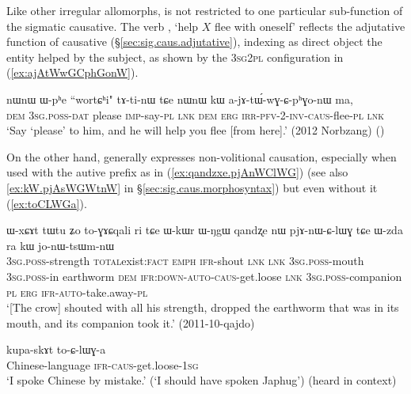 Like other irregular allomorphs,  is not restricted to one particular sub-func\-tion of the sigmatic causative. The verb , `help $X$ flee with oneself' reflects the adjutative function of causative (§\ref{sec:sig.caus.adjutative}), indexing as direct object the entity helped by the subject, as shown by the \textsc{3sg}\fl{}\textsc{2pl} configuration in (\ref{ex:ajAtWwGCphGonW}).

\begin{exe}
\ex \label{ex:ajAtWwGCphGonW}
\gll nɯnɯ ɯ-pʰe ``wortɕʰi" tɤ-ti-nɯ tɕe nɯnɯ kɯ a-jɤ-tɯ́-wɣ-ɕ-pʰɣo-nɯ ma, \\
\textsc{dem} \textsc{3sg}.\textsc{poss}-\textsc{dat} please \textsc{imp}-say-\textsc{pl} \textsc{lnk} \textsc{dem} \textsc{erg} \textsc{irr}-\textsc{pfv}-2-\textsc{inv}-\textsc{caus}-flee-\textsc{pl} \textsc{lnk} \\
\glt `Say `please' to him, and he will help you flee [from here].' (2012 Norbzang)
()
\end{exe}

On the other hand,  generally expresses non-volitional causation, especially when used with the autive prefix as in (\ref{ex:qandzxe.pjAnWClWG}) (see also \ref{ex:kW.pjAsWGWtnW} in §\ref{sec:sig.caus.morphosyntax}) but even without it (\ref{ex:toCLWGa}).

\begin{exe}
\ex \label{ex:qandzxe.pjAnWClWG}
\gll ɯ-xɕɤt tɯ\redp{}tu ʑo to-ɣɤɕqali ri tɕe ɯ-kɯr ɯ-ŋgɯ qandʐe nɯ pjɤ-nɯ-ɕ-lɯɣ tɕe ɯ-zda ra kɯ jo-nɯ-tsɯm-nɯ \\
\textsc{3sg}.\textsc{poss}-strength \textsc{total}\redp{}exist:\textsc{fact} \textsc{emph} \textsc{ifr}-shout \textsc{lnk} \textsc{lnk} \textsc{3sg}.\textsc{poss}-mouth \textsc{3sg}.\textsc{poss}-in earthworm \textsc{dem} \textsc{ifr}:\textsc{down}-\textsc{auto}-\textsc{caus}-get.loose \textsc{lnk} \textsc{3sg}.\textsc{poss}-companion \textsc{pl} \textsc{erg} \textsc{ifr}-\textsc{auto}-take.away-\textsc{pl} \\
\glt `[The crow] shouted with all his strength, dropped the earthworm that was in its mouth, and its companion took it.' (2011-10-qajdo)
\end{exe}

\begin{exe}
\ex \label{ex:toCLWGa}
\gll kupa-skɤt to-ɕ-lɯɣ-a \\
Chinese-language \textsc{ifr}-\textsc{caus}-get.loose-\textsc{1sg} \\
\glt `I spoke Chinese by mistake.' (`I should have spoken Japhug') (heard in context)
\end{exe}


